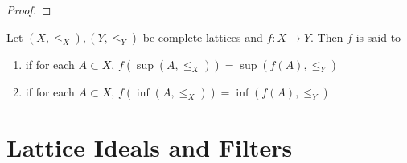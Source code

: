 \documentclass{book}
\begin{document}
	\begin{proof}
		
	\end{proof}
	
	
	
	
	
	
	
	
	
	
	
	
	
	
	
	
	\begin{defn}
		Let $(X, \leq_X), (Y, \leq_Y)$ be complete lattices and $f:X \rightarrow Y$. Then $f$ is said to 
		\begin{enumerate}
			\item {} if for each $A \subset X$, $f(\sup (A, \leq_X) ) = \sup(f(A), \leq_Y)$
			\item {} if for each $A \subset X$, $f(\inf (A, \leq_X) ) = \inf(f(A), \leq_Y)$
		\end{enumerate}
	\end{defn}
	
	
	
	
	
	
	
	
	
	
	
	
	
	
	
	
	
	
	
	
	
	
	
	
	
	
	
	
	
	
	
	
	
	
	
	
	
	
	
	
	
	
	
	
	
	
	
	
	
	
	
	
	
	
	
	
	
	
	
	\newpage
	\section{Lattice Ideals and Filters}
\end{document}
